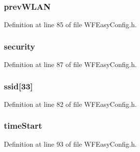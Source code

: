 \subsubsection[{prev\+W\+L\+A\+N}]{ prev\+W\+L\+A\+N}\label{structt_w_f_easy_config_ctx_a6847b94570010859cda0924289ca4edc}


Definition at line 85 of file W\+F\+Easy\+Config.\+h.

\hypertarget{structt_w_f_easy_config_ctx_a9333ef26affe031168b02f346cfc71cc}{}
\subsubsection[{security}]{ security}\label{structt_w_f_easy_config_ctx_a9333ef26affe031168b02f346cfc71cc}


Definition at line 87 of file W\+F\+Easy\+Config.\+h.

\hypertarget{structt_w_f_easy_config_ctx_a4c6c3ae4a2e404d5b58010fddb8713ad}{}
\subsubsection[{ssid}]{ ssid\mbox{[}33\mbox{]}}\label{structt_w_f_easy_config_ctx_a4c6c3ae4a2e404d5b58010fddb8713ad}


Definition at line 82 of file W\+F\+Easy\+Config.\+h.

\hypertarget{structt_w_f_easy_config_ctx_a4d4474eb729f6bdd02c975ccc10829f0}{}
\subsubsection[{time\+Start}]{ time\+Start}\label{structt_w_f_easy_config_ctx_a4d4474eb729f6bdd02c975ccc10829f0}


Definition at line 93 of file W\+F\+Easy\+Config.\+h.

\hypertarget{structt_w_f_easy_config_ctx_aab7cf12125f16245546ef7411994ebb9}{}
